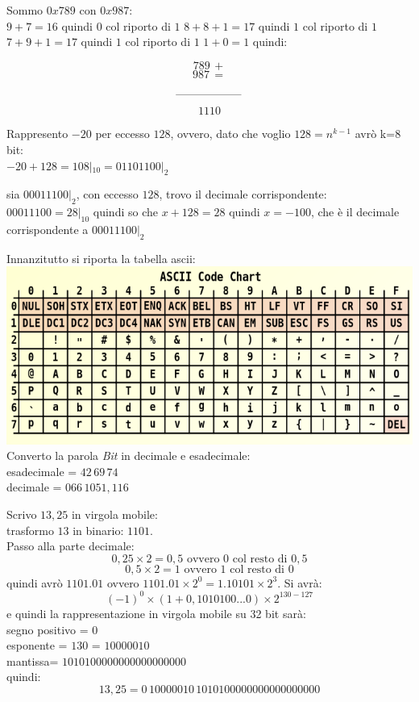 \documentclass[a4paper,12pt, oneside]{book}
\begin{document}
\begin{esercizio}
	Sommo $0x789$ con $0x987$:\\
	$9+7=16$ quindi $0$ col riporto di $1$
	$8+8+1=17$ quindi $1$ col riporto di $1$
	$7+9+1=17$ quindi $1$ col riporto di $1$
	$1+0=1$
	quindi:

	$$789\,+$$
	$$987\,=$$
	$$\rule{60pt}{.4pt}$$
	$$1110$$
\end{esercizio}
\begin{esercizio}
	Rappresento $-20$ per eccesso $128$, ovvero, dato che voglio $128=n^{k-1}$ avrò k=8 bit:\\
	$-20+128=108|_{10}=01101100|_2$
\end{esercizio}
\begin{esercizio}
	sia $00011100|_2$, con eccesso $128$, trovo il decimale corrispondente:\\
	$00011100=28|_{10}$ quindi so che $x+128=28$ quindi $x=-100$, che è il decimale corrispondente a $00011100|_2$
\end{esercizio}
\begin{esercizio}
	Innanzitutto si riporta la tabella ascii:\\
	\includegraphics[scale=0.5]{img/ascii.png}
	Converto la parola \textit{Bit} in decimale e esadecimale:\\
	esadecimale = $42\,69\,74$\\
	decimale = $ 066\,1051,116$
\end{esercizio}
\begin{esercizio}
	Scrivo $13,25$ in virgola mobile:\\
	trasformo $13$ in binario: $1101$.\\
	Passo alla parte decimale:\\
	$$0,25\times 2=0,5 \mbox{ ovvero } 0 \mbox{ col resto di } 0,5$$
	$$0,5\times 2=1 \mbox{ ovvero } 1 \mbox{ col resto di } 0$$
	quindi avrò $1101.01$ ovvero $1101.01\times 2^0=1.10101\times 2^3$. Si avrà:
	$$(-1)^0\times (1+0,1010100...0)\times 2^{130-127}$$
	e quindi la rappresentazione in virgola mobile su 32 bit  sarà:\\
	segno positivo = $0$\\
	esponente = $130$ = $10000010$\\
	mantissa= $1010100000000000000000$\\
	quindi:
	$$13,25=0\,10000010\,1010100000000000000000$$
\end{esercizio}
\end{document}
